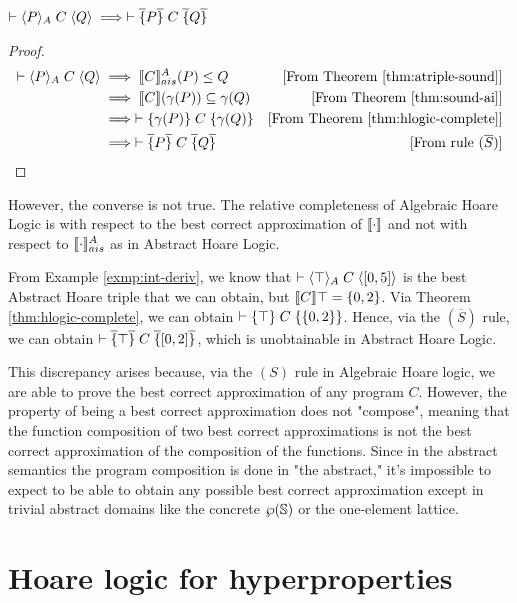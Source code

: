 \documentclass[
  10pt,       %
  twoside,    %
  a4paper,    %
  english,    %
  tikz,       %
  openright,  %
]{book}
\begin{document}
\begin{theorem}
  $\vdash \langle P \rangle_{A} \; C \; \langle Q \rangle \implies \vdash \overline{\{} P \overline{\}} \; C \; \overline{\{} Q \overline{\}}$
\end{theorem}
\begin{proof}
  \begin{align*}
    \vdash \langle P \rangle_{A} \; C \; \langle Q \rangle
      &\implies \llbracket C \rrbracket_{ais}^{A}(P) \leq Q
      &\text{[From Theorem \ref{thm:atriple-sound}]} \\
      &\implies \llbracket C \rrbracket(\gamma(P)) \subseteq \gamma(Q)
      &\text{[From Theorem \ref{thm:sound-ai}]} \\
      &\implies \vdash \{ \gamma(P) \} \; C \; \{ \gamma(Q) \}
      &\text{[From Theorem \ref{thm:hlogic-complete}]} \\
      &\implies \vdash \overline{\{} P \overline{\}} \; C \; \overline{\{} Q \overline{\}}
      &\text{[From rule $(\overline{S})$]} \\
  \end{align*}
\end{proof}

However, the converse is not true. The relative completeness of Algebraic Hoare
Logic is with respect to the best correct approximation of $\llbracket \cdot \rrbracket$ and not
with respect to $\llbracket \cdot \rrbracket_{ais}^{A}$ as in Abstract Hoare Logic.

\begin{example}[Counterexample]
  From Example \ref{exmp:int-deriv}, we know that $\vdash \langle \top \rangle_{A} \; C \; \langle [0, 5] \rangle$ is
  the best Abstract Hoare triple that we can obtain, but $\llbracket C \rrbracket{\top} = \{0,
  2\}$. Via Theorem \ref{thm:hlogic-complete}, we can obtain
  $\vdash \{ \top \} \; C \; \{ \{0, 2\} \}$. Hence, via the $(\overline{S})$ rule, we can
  obtain $\vdash \overline{\{} \top \overline{\}} \; C \; \overline{\{} [0, 2] \overline{\}}$, which is unobtainable in Abstract Hoare
  Logic.
\end{example}

This discrepancy arises because, via the $(S)$ rule in Algebraic Hoare logic,
we are able to prove the best correct approximation of any program $C$. However, the 
property of being a best correct approximation does not "compose",
meaning that the function composition of two best correct approximations is not
the best correct approximation of the composition of the functions. Since in the
abstract semantics the program composition is done in "the abstract," it's
impossible to expect to be able to obtain any possible best correct
approximation except in trivial abstract domains like the concrete
$\wp(\mathbb{S})$ or the one-element lattice.

\section{Hoare logic for hyperproperties}
\end{document}
